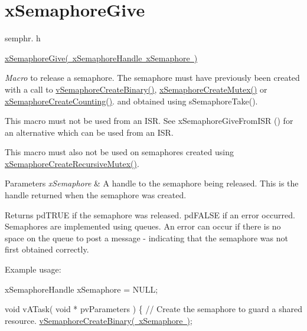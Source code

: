 \hypertarget{group__x_semaphore_give}{}\section{x\+Semaphore\+Give}
\label{group__x_semaphore_give}
semphr. h 
\begin{DoxyPre}\mbox{\hyperlink{semphr_8h_aae55761cabfa9bf85c8f4430f78c0953}{xSemaphoreGive( xSemaphoreHandle xSemaphore )}}\end{DoxyPre}


{\itshape Macro} to release a semaphore. The semaphore must have previously been created with a call to \mbox{\hyperlink{semphr_8h_ae10bffadd26fbd5bcce76bf33a83ef30}{v\+Semaphore\+Create\+Binary()}}, \mbox{\hyperlink{semphr_8h_aa6a00aa9b91a9e5b3ebe4ae1c3f115c6}{x\+Semaphore\+Create\+Mutex()}} or \mbox{\hyperlink{semphr_8h_a7764616a918a46115403569a88148ad4}{x\+Semaphore\+Create\+Counting()}}. and obtained using s\+Semaphore\+Take().

This macro must not be used from an I\+SR. See x\+Semaphore\+Give\+From\+I\+SR () for an alternative which can be used from an I\+SR.

This macro must also not be used on semaphores created using \mbox{\hyperlink{semphr_8h_a1bbc843be5a41ea83d2693b2189fc0f8}{x\+Semaphore\+Create\+Recursive\+Mutex()}}.


\begin{DoxyParams}{Parameters}
{\em x\+Semaphore} & A handle to the semaphore being released. This is the handle returned when the semaphore was created.\\
\hline
\end{DoxyParams}
\begin{DoxyReturn}{Returns}
pd\+T\+R\+UE if the semaphore was released. pd\+F\+A\+L\+SE if an error occurred. Semaphores are implemented using queues. An error can occur if there is no space on the queue to post a message -\/ indicating that the semaphore was not first obtained correctly.
\end{DoxyReturn}
Example usage\+: 
\begin{DoxyPre}
xSemaphoreHandle xSemaphore = NULL;\end{DoxyPre}



\begin{DoxyPre}void vATask( void * pvParameters )
\{
   // Create the semaphore to guard a shared resource.
   \mbox{\hyperlink{semphr_8h_ae10bffadd26fbd5bcce76bf33a83ef30}{vSemaphoreCreateBinary( xSemaphore )}};\end{DoxyPre}



